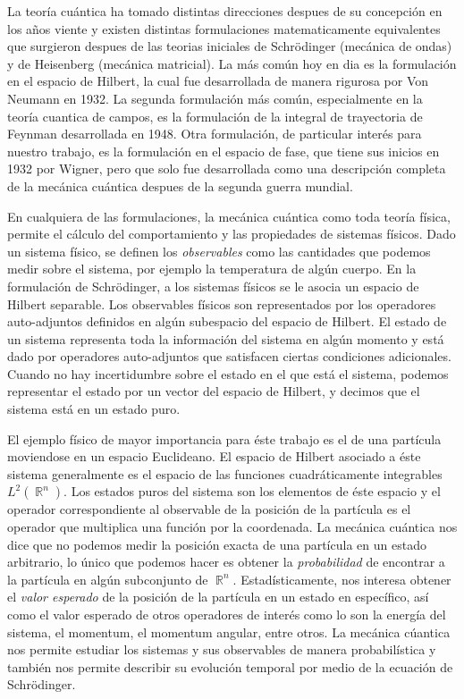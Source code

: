 \documentclass[a4paper]{report}
\DeclareMathOperator{\R}{\mathbb{R}}
\begin{document}
  La teoría cuántica ha tomado distintas direcciones despues
  de su concepción en los años viente y existen distintas
  formulaciones matematicamente equivalentes que surgieron
  despues de las teorias iniciales de Schrödinger (mecánica
  de ondas) y de Heisenberg (mecánica matricial).  La más
  común hoy en dia es la formulación en el espacio de
  Hilbert, la cual fue desarrollada de manera rigurosa por
  Von Neumann en 1932.  La segunda formulación más común,
  especialmente en la teoría cuantica de campos, es la
  formulación de la integral de trayectoria de Feynman
  desarrollada en 1948.  Otra formulación, de particular
  interés para nuestro trabajo, es la formulación en el
  espacio de fase, que tiene sus inicios en 1932 por Wigner,
  pero que solo fue desarrollada como una descripción
  completa de la mecánica cuántica despues de la segunda
  guerra mundial. 

  En cualquiera de las formulaciones, la mecánica cuántica
  como toda teoría física, permite el cálculo del
  comportamiento y las propiedades de sistemas físicos. Dado
  un sistema físico, se definen los \textit{observables}
  como las cantidades que podemos medir sobre el sistema,
  por ejemplo la temperatura de algún cuerpo. En la
  formulación de Schrödinger, a los sistemas físicos se le
  asocia un espacio de Hilbert separable. Los observables
  físicos son representados por los operadores auto-adjuntos
  definidos en algún subespacio del espacio de Hilbert. El
  estado de un sistema representa toda la información del
  sistema en algún momento y está dado por operadores
  auto-adjuntos que satisfacen ciertas condiciones
  adicionales. Cuando no hay incertidumbre sobre el estado
  en el que está el sistema, podemos representar el estado
  por un vector del espacio de Hilbert, y decimos que el
  sistema está en un estado puro.

  El ejemplo físico de mayor importancia para éste trabajo
  es el de una partícula moviendose en un espacio
  Euclideano. El espacio de Hilbert asociado a éste sistema
  generalmente es el espacio de las funciones
  cuadráticamente integrables $L^2(\R^{n})$. Los estados
  puros del sistema son los elementos de éste espacio y el
  operador correspondiente al observable de la posición de
  la partícula es el operador que multiplica una función por
  la coordenada. La mecánica cuántica nos dice que no
  podemos medir la posición exacta de una partícula en un
  estado arbitrario, lo único que podemos hacer es obtener
  la \textit{probabilidad} de encontrar a la partícula en
  algún subconjunto de $\R^{n}$.  Estadísticamente, nos
  interesa obtener el \textit{valor esperado} de la posición
  de la partícula en un estado en específico, así como el
  valor esperado de otros operadores de interés como lo son
  la energía del sistema, el momentum, el momentum angular,
  entre otros. La mecánica cúantica nos permite estudiar los
  sistemas y sus observables de manera probabilística y
  también nos permite describir su evolución temporal por
  medio de la ecuación de Schrödinger. 
\end{document}
